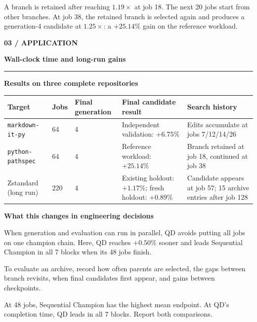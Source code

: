 \documentclass[10pt,a4paper]{article}
\newcommand{\pagetitle}[2]{%
  {\color{blue}\fontsize{11}{12}\selectfont\bfseries #1}\par
  {\color{ink}\fontsize{20}{22}\selectfont\bfseries #2}\vspace{3pt}\par
  {\color{line}\rule{\textwidth}{0.65pt}}\vspace{4pt}
}
\newcommand{\callout}[2]{%
  \colorbox{bluepale}{%
    \parbox{\dimexpr\linewidth-2\fboxsep\relax}{%
      \vspace{2pt}{\color{blue}\bfseries #1}\quad #2\vspace{2pt}%
    }%
  }%
}
\newcommand{\decisionbox}[3]{%
  \begin{minipage}[t]{0.315\textwidth}
    \vspace{0pt}%
    \colorbox{#1}{\parbox{\dimexpr\linewidth-2\fboxsep\relax}{%
      \RaggedRight\vspace{3pt}{\bfseries #2}\par\small #3\vspace{3pt}}}
  \end{minipage}%
}
\begin{document}
\vspace{7pt}
\callout{Pathspec lineage}{A branch is retained after reaching $1.19\times$ at job 18. The next 20 jobs start from other branches. At job 38, the retained branch is selected again and produces a generation-4 candidate at $1.25\times$: a $+25.14\%$ gain on the reference workload.}

\clearpage

\pagetitle{03 / APPLICATION}{Wall-clock time and long-run gains}

{\color{ink}\large\bfseries Results on three complete repositories}\par
\small
\setlength{\tabcolsep}{5pt}
\renewcommand{\arraystretch}{1.18}
\begin{tabularx}{\textwidth}{@{}Y C{13mm} C{20mm} C{40mm} Y@{}}
\toprule
Target & Jobs & Final generation & Final candidate result & Search history \\
\midrule
\texttt{markdown-it-py} & 64 & 4 & Independent validation: $+6.75\%$ & Edits accumulate at jobs 7/12/14/26 \\
\texttt{python-pathspec} & 64 & 4 & Reference workload: $+25.14\%$ & Branch retained at job 18, continued at job 38 \\
Zstandard (long run) & 220 & 4 & Existing holdout: $+1.17\%$; fresh holdout: $+0.89\%$ & Candidate appears at job 57; 15 archive entries after job 128 \\
\bottomrule
\end{tabularx}

\vspace{7pt}
{\color{ink}\large\bfseries What this changes in engineering decisions}\par
\vspace{3pt}
\decisionbox{bluepale}{1. Report time to threshold}{When generation and evaluation can run in parallel, QD avoids putting all jobs on one champion chain. Here, QD reaches $+0.50\%$ sooner and leads Sequential Champion in all 7 blocks when its 48 jobs finish.}\hfill
\decisionbox{greenpale}{2. Track branch revisits}{To evaluate an archive, record how often parents are selected, the gaps between branch revisits, when final candidates first appear, and gains between checkpoints.}\hfill
\decisionbox{orangepale}{3. Compare both jobs and time}{At 48 jobs, Sequential Champion has the highest mean endpoint. At QD's completion time, QD leads in all 7 blocks. Report both comparisons.}
\end{document}
